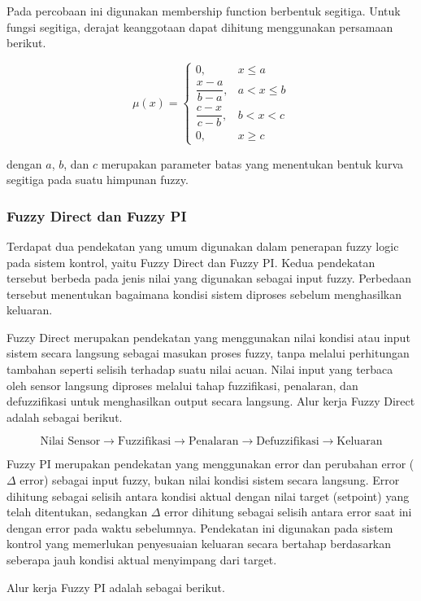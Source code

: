\documentclass[12pt,a4paper]{article}
\begin{document}
Pada percobaan ini digunakan membership function berbentuk segitiga. Untuk fungsi segitiga, derajat keanggotaan dapat dihitung menggunakan persamaan berikut.

\[
\mu(x)=
\begin{cases}
0, & x \leq a \\[6pt]
\dfrac{x-a}{b-a}, & a < x \leq b \\[8pt]
\dfrac{c-x}{c-b}, & b < x < c \\[8pt]
0, & x \geq c
\end{cases}
\]

dengan $a$, $b$, dan $c$ merupakan parameter batas yang menentukan bentuk kurva segitiga pada suatu himpunan fuzzy.

\subsubsection{Fuzzy Direct dan Fuzzy PI}

Terdapat dua pendekatan yang umum digunakan dalam penerapan fuzzy logic pada sistem kontrol, yaitu Fuzzy Direct dan Fuzzy PI. Kedua pendekatan tersebut berbeda pada jenis nilai yang digunakan sebagai input fuzzy. Perbedaan tersebut menentukan bagaimana kondisi sistem diproses sebelum menghasilkan keluaran.

Fuzzy Direct merupakan pendekatan yang menggunakan nilai kondisi atau input sistem secara langsung sebagai masukan proses fuzzy, tanpa melalui perhitungan tambahan seperti selisih terhadap suatu nilai acuan. Nilai input yang terbaca oleh sensor langsung diproses melalui tahap fuzzifikasi, penalaran, dan defuzzifikasi untuk menghasilkan output secara langsung. Alur kerja Fuzzy Direct adalah sebagai berikut.

\[
\text{Nilai Sensor}
\rightarrow
\text{Fuzzifikasi}
\rightarrow
\text{Penalaran}
\rightarrow
\text{Defuzzifikasi}
\rightarrow
\text{Keluaran}
\]

Fuzzy PI merupakan pendekatan yang menggunakan error dan perubahan error ($\Delta$ error) sebagai input fuzzy, bukan nilai kondisi sistem secara langsung. Error dihitung sebagai selisih antara kondisi aktual dengan nilai target (setpoint) yang telah ditentukan, sedangkan $\Delta$ error dihitung sebagai selisih antara error saat ini dengan error pada waktu sebelumnya. Pendekatan ini digunakan pada sistem kontrol yang memerlukan penyesuaian keluaran secara bertahap berdasarkan seberapa jauh kondisi aktual menyimpang dari target.

Alur kerja Fuzzy PI adalah sebagai berikut.
\end{document}
